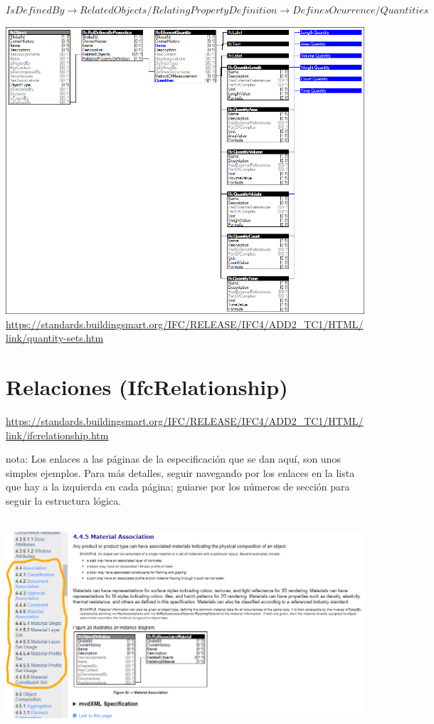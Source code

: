 \documentclass[spanish,12pt,a4paper,final,oneside]{book}
\begin{document}
\begin{small}
$IsDefinedBy \rightarrow RelatedObjects / RelatingPropertyDefinition \rightarrow DefinesOcurrence / Quantities$
\end{small}
\includegraphics[width=\textwidth]{quantity-sets}
\\ \url{https://standards.buildingsmart.org/IFC/RELEASE/IFC4/ADD2_TC1/HTML/link/quantity-sets.htm}



\section{Relaciones (IfcRelationship)}
\url{https://standards.buildingsmart.org/IFC/RELEASE/IFC4/ADD2_TC1/HTML/link/ifcrelationship.htm}

\begin{footnotesize}nota: Los enlaces a las páginas de la especificación que se dan aquí, son unos simples ejemplos. Para más detalles, seguir navegando por los enlaces en la lista que hay a la izquierda en cada página; guiarse por los números de sección para seguir la estructura lógica.\end{footnotesize}
\\ \includegraphics[width=\textwidth]{navegacion por los conceptos de la especificacion}
\end{document}

